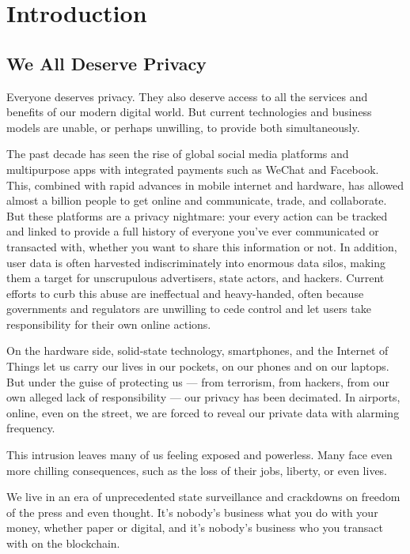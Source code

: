 \documentclass[8pt,fleqn,openany]{book}
\begin{document}
	\chapter{Introduction}\label{chap:intro}
	
	\section{We All Deserve Privacy}
	Everyone deserves privacy. They also deserve access to all the services and benefits of our modern digital world. But current technologies and business models are unable, or perhaps unwilling, to provide both simultaneously.
	
	The past decade has seen the rise of global social media platforms and multipurpose apps with integrated payments such as WeChat and Facebook. This, combined with rapid advances in mobile internet and hardware, has allowed almost a billion people to get online and communicate, trade, and collaborate. But these platforms are a privacy nightmare: your every action can be tracked and linked to provide a full history of everyone you've ever communicated or transacted with, whether you want to share this information or not. In addition, user data is often harvested indiscriminately into enormous data silos, making them a target for unscrupulous advertisers, state actors, and hackers. Current efforts to curb this abuse are ineffectual and heavy-handed, often because governments and regulators are unwilling to cede control and let users take responsibility for their own online actions.
	
	On the hardware side, solid-state technology, smartphones, and the Internet of Things let us carry our lives in our pockets, on our phones and on our laptops. But under the guise of protecting us — from terrorism, from hackers, from our own alleged lack of responsibility — our privacy has been decimated. In airports, online, even on the street, we are forced to reveal our private data with alarming frequency.
	
	This intrusion leaves many of us feeling exposed and powerless. Many face even more chilling consequences, such as the loss of their jobs, liberty, or even lives. 
	
	We live in an era of unprecedented state surveillance and crackdowns on freedom of the press and even thought. It’s nobody’s business what you do with your money, whether paper or digital, and it’s nobody's business who you transact with on the blockchain.
	
\end{document}
